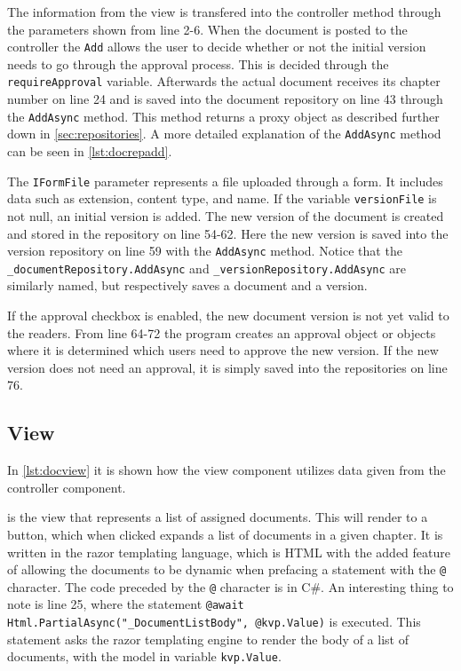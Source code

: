 \documentclass[../../master.tex]{subfiles}
\begin{document}
The information from the view is transfered into the controller method through the parameters shown from line 2-6.
When the document is posted to the controller the \texttt{Add} allows the user to decide whether or not the initial version needs to go through the approval process.
This is decided  through the \texttt{requireApproval} variable.
Afterwards the actual document receives its chapter number on line 24 and is saved into the document repository on line 43 through the \texttt{AddAsync} method.
This method returns a proxy object as described further down in \cref{sec:repositories}.
A more detailed explanation of the \texttt{AddAsync} method can be seen in \cref{lst:docrepadd}.
\newpage



The \texttt{IFormFile} parameter represents a file uploaded through a form. It includes data such as extension, content type, and name.
If the variable \texttt{versionFile} is not null, an initial version is added.
The new version of the document is created and stored in the repository on line 54-62.
Here the new version is saved into the version repository on line 59 with the \texttt{AddAsync} method.
Notice that the \texttt{_documentRepository.AddAsync} and \texttt{_versionRepository.AddAsync} are similarly named, but respectively saves a document and a version.

If the approval checkbox is enabled, the new document version is not yet valid to the readers.
From line 64-72 the program creates an approval object or objects where it is determined which users need to approve the new version.
If the new version does not need an approval, it is simply saved into the repositories on line 76.

\subsection{View}

In \cref{lst:docview} it is shown how the view component utilizes data given from the controller component.

 is the view that represents a list of assigned documents.
This will render to a button, which when clicked expands a list of documents in a given chapter.
It is written in the razor templating language, which is HTML with the added feature of allowing the documents to be dynamic when prefacing a statement with the \texttt{@} character.
The code preceded by the \texttt{@} character is in C\#.
An interesting thing to note is line 25, where the statement \texttt{@await Html.PartialAsync("_DocumentListBody", @kvp.Value)} is executed.
This statement asks the razor templating engine to render the body of a list of documents, with the model in variable \texttt{kvp.Value}.
\end{document}

